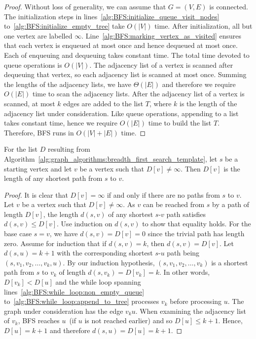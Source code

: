 \begin{proof}
Without loss of generality, we can assume that $G = (V, E)$ is
connected. The initialization steps in
lines~\ref{alg:BFS:initialize_queue_visit_nodes}
to~\ref{alg:BFS:initialize_empty_tree} take $O(|V|)$ time. After
initialization, all but one vertex are labelled
$\infty$. Line~\ref{alg:BFS:marking_vertex_as_visited} ensures that
each vertex is enqueued at most once and hence
dequeued at most once. Each of
enqueuing and dequeuing
takes constant time. The total time devoted to queue operations is
$O(|V|)$. The adjacency list of a vertex is
scanned after dequeuing that vertex, so each
adjacency list is scanned at most once. Summing
the lengths of the adjacency lists, we have $\Theta(|E|)$ and
therefore we require $O(|E|)$ time to scan the adjacency lists. After
the adjacency list of a vertex is scanned, at most $k$ edges are added
to the list $T$, where $k$ is the length of the adjacency
list under consideration. Like
queue operations, appending to a list takes
constant time, hence we require $O(|E|)$ time to build the list
$T$. Therefore, BFS runs in $O(|V| + |E|)$ time.
\end{proof}

\begin{theorem}
\label{thm:graph_algorithms:BFS:list_D_length_shortest_paths}
For the list $D$ resulting from
Algorithm~\ref{alg:graph_algorithms:breadth_first_search_template},
let $s$ be a starting vertex and let $v$ be a vertex such that
$D[v] \neq \infty$. Then $D[v]$ is the length of any shortest path
from $s$ to $v$.
\end{theorem}

\begin{proof}
It is clear that $D[v] = \infty$ if and only if there are no paths
from $s$ to $v$. Let $v$ be a vertex such that $D[v] \neq \infty$. As
$v$ can be reached from $s$ by a path of length $D[v]$, the length
$d(s,v)$ of any shortest $s$-$v$ path satisfies $d(s,v) \leq
D[v]$. Use induction on $d(s,v)$ to show that equality holds. For the
base case $s = v$, we have $d(s,v) = D[v] = 0$ since the trivial path
has length zero. Assume for induction that if $d(s,v) = k$, then
$d(s,v) = D[v]$.
Let $d(s,u) = k + 1$ with the corresponding shortest $s$-$u$ path
being $(s, v_1, v_2, \dots, v_k, u)$. By our induction hypothesis,
$(s, v_1, v_2, \dots, v_k)$ is a shortest path from $s$ to $v_k$ of
length $d(s, v_k) = D[v_k] = k$. In other words, $D[v_k] < D[u]$ and
the while loop spanning lines~\ref{alg:BFS:while_loop:non_empty_queue}
to~\ref{alg:BFS:while_loop:append_to_tree} processes $v_k$ before
processing $u$. The graph under consideration has the edge $v_k
u$. When examining the adjacency list of $v_k$, BFS reaches $u$~(if
$u$ is not reached earlier) and so $D[u] \leq k + 1$. Hence,
$D[u] = k + 1$ and therefore $d(s,u) = D[u] = k + 1$.
\end{proof}

